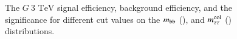         \begin{figure}[htbp]
            \centering
            \caption{
                The $G~\text{3 TeV}$ signal efficiency, background efficiency, and the significance for different cut values on the 
                $m_\mathrm{bb}$ (\protect{}), and $m_\mathrm{\tau\tau}^\mathrm{col}$ (\protect{}) distributions.
            }
            \label{fig:G3000_opt}
        \end{figure}
